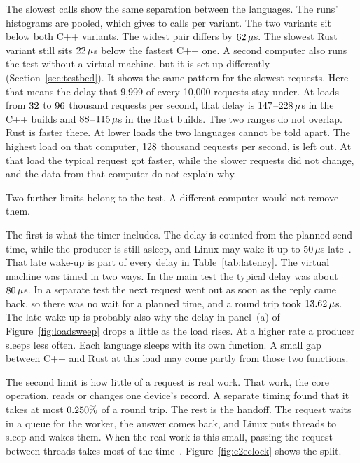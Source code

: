 \documentclass[english,oneside,a4paper,censored,csm,software-track-2020]{HYthesisML}
\begin{document}
The slowest calls show the same separation between the languages.
The runs' histograms are pooled, which
gives \FarTailSamplesMin{} to \FarTailSamplesMax{} calls per variant. The
two \FarTailLower{} variants sit below both C++ variants. The widest pair
differs by $62\,\mu$s. The slowest Rust variant still sits
$22\,\mu$s below the fastest C++ one. A second computer also runs the test without a virtual machine, but it is set
up differently (Section~\ref{sec:testbed}). It shows the same pattern for the
slowest requests. Here that means the delay that 9{,}999 of every 10{,}000
requests stay under. At loads from $32$ to $96$
thousand requests per second, that delay is
$147$--$228\,\mu$s in the C++ builds and
$88$--$115\,\mu$s in the Rust builds. The two ranges
do not overlap. Rust is faster there. At lower loads the two languages cannot
be told apart. The highest load on that computer, $128$ thousand
requests per second, is left out. At that load the typical request got faster,
while the slower requests did not change, and the data from that computer do
not explain why.

Two further limits belong to the test. A different computer would not remove
them.

The first is what the timer includes. The delay is counted from the planned
send time, while the producer is still asleep, and Linux may wake it up to
$50\,\mu$s late~\cite{linux2026timerslack}. That late wake-up is part of every
delay in Table~\ref{tab:latency}. The virtual machine was timed in two ways.
In the main test the typical delay was about $80\,\mu$s. In a
separate test the next request went out as soon as the reply came back, so
there was no wait for a planned time, and a round trip took
$13.62\,\mu$s. The late wake-up is probably also why the delay in
panel~(a) of Figure~\ref{fig:loadsweep} drops a little as the load rises. At a
higher rate a producer sleeps less often. Each language sleeps with its own
function. A small gap between C++ and Rust at this load may come partly from
those two functions.

The second limit is how little of a request is real work. That work, the
core operation, reads or changes one device's record. A separate timing found
that it takes at most $0.250\%$ of a round trip. The rest is the
handoff. The request waits in a queue for the worker, the answer comes back,
and Linux puts threads to sleep and wakes them. When the real work is this
small, passing the request between threads takes most of the
time~\cite{zhou2025oltp}. Figure~\ref{fig:e2eclock} shows the split.
\end{document}
